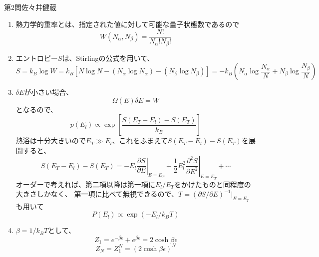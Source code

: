 \documentclass[fleqn]{jbook}
\begin{document}
\begin{answer}{第2問}{佐々井健蔵}
\begin{enumerate}
\item 熱力学的重率とは、指定された値に対して可能な量子状態数であるので
\begin{equation}
W(N_{\alpha },N_{\beta })=\frac{N!}{N_{\alpha }!N_{\beta }!}
\end{equation}

\item エントロピー$S$は、Stirlingの公式を用いて、
\begin{equation}
S=k_B\log W=k_B[N\log N-(N_{\alpha }\log N_{\alpha })-(N_{\beta }\log N_{\beta })]
=-k_B\left( N_{\alpha }\log \frac{N_{\alpha }}{N}+N_{\beta }\log \frac{N_{\beta }}{N}\right)
\end{equation}

\item $\delta E$が小さい場合、
\begin{equation}
\Omega (E)\delta E=W
\end{equation}
となるので、
\begin{equation}
p(E_l)\propto \exp \left[ \frac{S(E_T-E_l)-S(E_T)}{k_B}\right]
\end{equation}
熱浴は十分大きいので$E_T\gg E_l$、これをふまえて$S(E_T-E_l)-S(E_T)$を展開すると、
\begin{equation}
S(E_T-E_l)-S(E_T)=-E_l\left.\frac{\partial S}{\partial E}\right|_{E=E_T}
                    +\frac{1}{2}E_l^2\left.\frac{\partial ^2S}{\partial E^2}\right|_{E=E_T}+\cdots 
\end{equation}
オーダーで考えれば、第二項以降は第一項に$E_l/E_T$をかけたものと同程度の大きさしかなく、
第一項に比べて無視できるので、$T=(\partial S/\partial E)^{-1}|_{E=E_T}$も用いて
\begin{equation}
P(E_l)\propto \exp (-E_l/k_BT)
\end{equation}

\item $\beta =1/k_BT$として、
\begin{equation}
Z_1=e^{-\beta \epsilon }+e^{\beta \epsilon }=2\cosh \beta \epsilon
\end{equation}
\begin{equation}
Z_N=Z_1^N=(2\cosh \beta \epsilon)^N
\end{equation}


\end{enumerate}
\end{answer}
\end{document}
